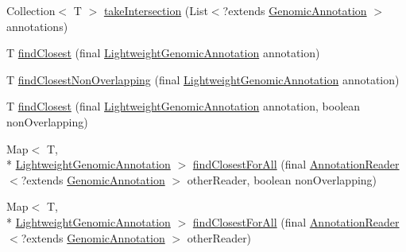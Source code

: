 \begin{DoxyCompactItemize}
\item 
Collection$<$ T $>$ \hyperlink{classbroad_1_1core_1_1annotation_1_1_annotation_reader_3_01_t_01extends_01_genomic_annotation_01_4_afdfc5f90b52549854e415baa7633d6f5}{take\+Intersection} (List$<$?extends \hyperlink{interfacebroad_1_1core_1_1annotation_1_1_genomic_annotation}{Genomic\+Annotation} $>$ annotations)
\item 
T \hyperlink{classbroad_1_1core_1_1annotation_1_1_annotation_reader_3_01_t_01extends_01_genomic_annotation_01_4_aa286fc7d76fbc1e343ba918e3c41a3a6}{find\+Closest} (final \hyperlink{interfacebroad_1_1core_1_1annotation_1_1_lightweight_genomic_annotation}{Lightweight\+Genomic\+Annotation} annotation)
\item 
T \hyperlink{classbroad_1_1core_1_1annotation_1_1_annotation_reader_3_01_t_01extends_01_genomic_annotation_01_4_ad3d7b5c1ad25dcb44a1112a9c09e897a}{find\+Closest\+Non\+Overlapping} (final \hyperlink{interfacebroad_1_1core_1_1annotation_1_1_lightweight_genomic_annotation}{Lightweight\+Genomic\+Annotation} annotation)
\item 
T \hyperlink{classbroad_1_1core_1_1annotation_1_1_annotation_reader_3_01_t_01extends_01_genomic_annotation_01_4_acacd79e1b962e50cff83d99201ded731}{find\+Closest} (final \hyperlink{interfacebroad_1_1core_1_1annotation_1_1_lightweight_genomic_annotation}{Lightweight\+Genomic\+Annotation} annotation, boolean non\+Overlapping)
\item 
Map$<$ T, \\*
\hyperlink{interfacebroad_1_1core_1_1annotation_1_1_lightweight_genomic_annotation}{Lightweight\+Genomic\+Annotation} $>$ \hyperlink{classbroad_1_1core_1_1annotation_1_1_annotation_reader_3_01_t_01extends_01_genomic_annotation_01_4_ae7832c0a60f97575145b396dce267ec8}{find\+Closest\+For\+All} (final \hyperlink{classbroad_1_1core_1_1annotation_1_1_annotation_reader_3_01_t_01extends_01_genomic_annotation_01_4_adc7b77cf9681958941014c7b460dbb9f}{Annotation\+Reader}$<$?extends \hyperlink{interfacebroad_1_1core_1_1annotation_1_1_genomic_annotation}{Genomic\+Annotation} $>$ other\+Reader, boolean non\+Overlapping)
\item 
Map$<$ T, \\*
\hyperlink{interfacebroad_1_1core_1_1annotation_1_1_lightweight_genomic_annotation}{Lightweight\+Genomic\+Annotation} $>$ \hyperlink{classbroad_1_1core_1_1annotation_1_1_annotation_reader_3_01_t_01extends_01_genomic_annotation_01_4_a6eddd5a71c31c57621f3d0bb483035d9}{find\+Closest\+For\+All} (final \hyperlink{classbroad_1_1core_1_1annotation_1_1_annotation_reader_3_01_t_01extends_01_genomic_annotation_01_4_adc7b77cf9681958941014c7b460dbb9f}{Annotation\+Reader}$<$?extends \hyperlink{interfacebroad_1_1core_1_1annotation_1_1_genomic_annotation}{Genomic\+Annotation} $>$ other\+Reader)

\end{DoxyCompactItemize}

